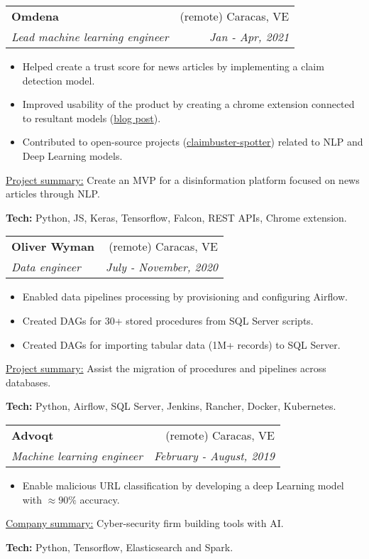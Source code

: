 \documentclass[letterpaper,11pt]{article}
\makeatletter
\newcommand{\sepsection}{\vspace{25pt}}
\newcommand{\resumeItem}[1]{%
  \item\small{
    #1
  }
}
\newcommand{\resumeSubheading}[4]{
  \vspace{8pt}\item%
    \begin{tabular*}{0.97\textwidth}[t]{l@{\extracolsep{\fill}}r}
      \textbf{#1} & #2 \\
      \textit{\small#3} & \textit{\small #4} \\
    \end{tabular*}\vspace{-5pt}
}
\newcommand{\resumeItemListStart}{\begin{itemize}}
\newcommand{\resumeItemListEnd}{\end{itemize}\vspace{-5pt}}
\newcommand{\resumeTech}[2]{
 \underline{#1:} #2
}
\makeatother
\begin{document}
    \resumeSubheading
      {Omdena}{(remote) Caracas, VE}
      {Lead machine learning engineer}{Jan - Apr, 2021}
      \resumeItemListStart
      \resumeItem{Helped create a trust score for news articles by implementing a claim detection model.}
      \resumeItem{Improved usability of the product by creating a chrome extension connected to resultant models (\href{https://www.omdena.com/blog/fighting-misinformation}{blog post}).}
      \resumeItem{Contributed to open-source projects (\href{https://github.com/utaresearch/claimbuster-spotter}{claimbuster-spotter}) related to NLP and Deep Learning models.}
      \resumeItemListEnd
      \resumeTech{Project summary}{Create an MVP for a disinformation platform focused on news articles through NLP.}
      \begin{tcolorbox}[width=.73\linewidth]
          \textbf{Tech:} Python, JS, Keras, Tensorflow, Falcon, REST APIs, Chrome extension.
      \end{tcolorbox}

\sepsection
    \resumeSubheading
      {Oliver Wyman}{(remote) Caracas, VE}
      {Data engineer}{July - November, 2020}
      \resumeItemListStart
      \resumeItem{Enabled data pipelines processing by provisioning and configuring Airflow.}
      \resumeItem{Created DAGs for 30+ stored procedures from SQL Server scripts.}
      \resumeItem{Created DAGs for importing tabular data (1M+ records) to SQL Server.}
      \resumeItemListEnd
      \resumeTech{Project summary}{Assist the migration of procedures and pipelines across databases.}
      \begin{tcolorbox}[width=.7\linewidth]
          \textbf{Tech:} Python, Airflow, SQL Server, Jenkins, Rancher, Docker, Kubernetes.
      \end{tcolorbox}

    \sepsection
    
    \resumeSubheading
      {Advoqt}{(remote) Caracas, VE}
      {Machine learning engineer}{February - August, 2019}
      \resumeItemListStart
      \resumeItem{Enable malicious URL classification by developing a deep Learning model with $\approx 90\%$ accuracy.}
      \resumeItemListEnd
      \resumeTech{Company summary}{Cyber-security firm building tools with AI.}
      \begin{tcolorbox}[width=.5\linewidth]
          \textbf{Tech:} Python, Tensorflow, Elasticsearch and Spark.
      \end{tcolorbox}
\end{document}
